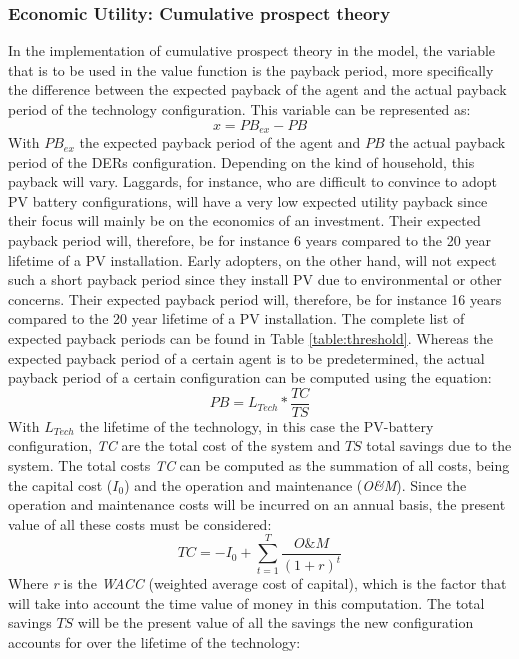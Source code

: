 \subsubsection{Economic Utility: Cumulative prospect theory}
In the implementation of cumulative prospect theory in the model, the variable that is to be used in the value function is the payback period, more specifically the difference between the expected payback of the agent and the actual payback period of the technology configuration. This variable can be represented as:
\begin{equation}
    x = PB_{ex} - PB    
\end{equation}
With $PB_{ex}$ the expected payback period of the agent and $PB$ the actual payback period of the DERs configuration. Depending on the kind of household, this payback will vary. Laggards, for instance, who are difficult to convince to adopt PV battery configurations, will have a very low expected utility payback since their focus will mainly be on the economics of an investment. Their expected payback period will, therefore, be for instance 6 years compared to the 20 year lifetime of a PV installation. Early adopters, on the other hand, will not expect such a short payback period since they install PV due to environmental or other concerns. Their expected payback period will, therefore, be for instance 16 years compared to the 20 year lifetime of a PV installation. The complete list of expected payback periods can be found in Table \ref{table:threshold}. Whereas the expected payback period of a certain agent is to be predetermined, the actual payback period of a certain configuration can be computed using the equation: 
\begin{equation}
    PB = L_{Tech}*\frac{TC}{TS}
\end{equation}
With $L_{Tech}$ the lifetime of the technology, in this case the PV-battery configuration, \textit{TC} are the total cost of the system and $TS$ total savings due to the system. The total costs \textit{TC} can be computed as the summation of all costs, being the capital cost ($I_0$) and the operation and maintenance (\textit{O\&M}). Since the operation and maintenance costs will be incurred on an annual basis, the present value of all these costs must be considered:
\begin{equation}
    TC = - I_0 + \sum_{t=1}^{T} \frac{O\&M}{(1+r)^t}
\end{equation}
Where \textit{r} is the\textit{ WACC} (weighted average cost of capital), which is the factor that will take into account the time value of money in this computation. The total savings $TS$ will be the present value of all the savings the new configuration accounts for over the lifetime of the technology:
